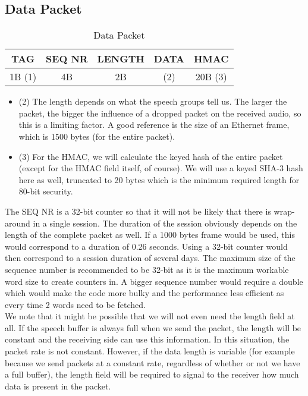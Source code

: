 \documentclass[a4paper]{article}
\begin{document}
\subsection{Data Packet}

\begin{table}[H]
    \begin{center}
        \begin{tabular}{| c | c | c | c | c |}
            \hline
            TAG & SEQ NR & LENGTH & DATA & HMAC \\ \hline
            1B (1) & 4B & 2B & (2) & 20B (3) \\
            \hline
        \end{tabular}
    \end{center}
    
    \caption{Data Packet}
    \label{tab:data_packet}
\end{table}

\begin{itemize}
  \item (2) The length depends on what the speech groups tell us. The larger the packet, the bigger the influence of a dropped packet on the received audio, so this is a limiting factor. A good reference is the size of an Ethernet frame, which is 1500 bytes (for the entire packet).
  \item (3) For the HMAC, we will calculate the keyed hash of the entire packet (except for the HMAC field itself, of course). We will use a keyed SHA-3 hash here as well, truncated to 20 bytes which is the minimum required length for 80-bit security.
\end{itemize}

The SEQ NR is a 32-bit counter so that it will not be likely that there is wrap-around in a single session. The duration of the session obviously depends on the length of the complete packet as well. If a 1000 bytes frame would be used, this would correspond to a duration of 0.26 seconds. Using a 32-bit counter would then correspond to a session duration of several days. The maximum size of the sequence number is recommended to be 32-bit as it is the maximum workable word size to create counters in. A bigger sequence number would require a double which would make the code more bulky and the performance less efficient as every time 2 words need to be fetched.\\

We note that it might be possible that we will not even need the length field at all. If the speech buffer is always full when we send the packet, the length will be constant and the receiving side can use this information. In this situation, the packet rate is not constant. However, if the data length is variable (for example because we send packets at a constant rate, regardless of whether or not we have a full buffer), the length field will be required to signal to the receiver how much data is present in the packet.
\end{document}
